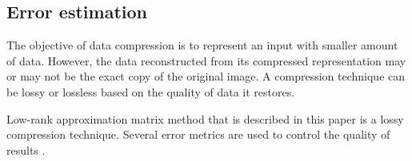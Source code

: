 
\subsection{Error estimation}
\label{sec:error-estimation}

The objective of data compression is to represent an input with smaller amount of data. However, the data reconstructed from its compressed representation may or may not be the exact copy of the original image. A compression technique can be lossy or lossless based on the quality of data it restores.

Low-rank approximation matrix method that is described in this paper is a lossy compression technique. Several error metrics are used to control the quality of results \cite{SairaBanu2015}.

